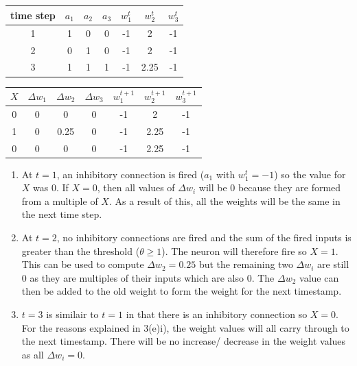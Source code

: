 \documentclass[a4paper]{report}
\begin{document}
\subsection{}
\begin{tabular}{| c | c | c | c | c | c | c |}
    \hline
    time step & \(a_1\) & \(a_2\) & \(a_3\) & \(w_1^t\) & \(w_2^t\) & \(w_3^t\) \\ [0.5ex]
    \hline\hline
    1         & 1       & 0       & 0       & -1        & 2         & -1        \\
    \hline
    2         & 0       & 1       & 0       & -1        & 2         & -1        \\
    \hline
    3         & 1       & 1       & 1       & -1        & 2.25      & -1        \\
    \hline
\end{tabular}
\begin{tabular}{| c | c | c | c | c | c | c |}
    \hline
    \(X\) & \(\Delta w_1\) & \(\Delta w_2\) & \(\Delta w_3\) & \(w_1^{t+1}\) & \(w_2^{t+1}\) & \(w_3^{t+1}\) \\ [0.5ex]
    \hline\hline
    0     & 0              & 0              & 0              & -1            & 2             & -1            \\
    \hline
    1     & 0              & 0.25           & 0              & -1            & 2.25          & -1            \\
    \hline
    0     & 0              & 0              & 0              & -1            & 2.25          & -1            \\
    \hline
\end{tabular}

\begin{enumerate}
    \renewcommand{\theenumi}{\roman{enumi}}
    \item At \(t=1\), an inhibitory connection is fired (\(a_1\) with \(w_1^t = -1\)) so the value for \(X\) was 0. If \(X = 0\), then all values of \(\Delta w_i\) will be 0 because they are formed from a multiple of \(X\). As a result of this, all the weights will be the same in the next time step.
    \item At \(t=2\), no inhibitory connections are fired and the sum of the fired inputs is greater than the threshold (\(\theta \geq 1\)). The neuron will therefore fire so \(X = 1\). This can be used to compute \(\Delta w_2 = 0.25\) but the remaining two \(\Delta w_i\) are still 0 as they are multiples of their inputs which are also 0. The \(\Delta w_2\) value can then be added to the old weight to form the weight for the next timestamp.
    \item \(t=3\) is similair to \(t=1\) in that there is an inhibitory connection so \(X = 0\). For the reasons explained in 3(e)i), the weight values will all carry through to the next timestamp. There will be no increase/ decrease in the weight values as all \(\Delta w_i = 0\).
\end{enumerate}
\end{document}
